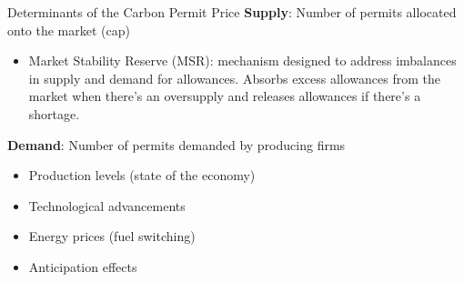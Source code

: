 \documentclass{beamer}
\begin{document}
\begin{frame}{Determinants of the Carbon Permit Price}
\textbf{Supply}: Number of permits allocated onto the market (cap)
    \begin{itemize}\small
        \item Market Stability Reserve (MSR): mechanism designed to address imbalances in supply and demand for allowances. Absorbs excess allowances from the market when there's an oversupply and releases allowances if there's a shortage.
    \end{itemize}
\textbf{Demand}: Number of permits demanded by producing firms
    \begin{itemize}
        \item Production levels (state of the economy)
        \item Technological advancements
        \item Energy prices (fuel switching)
        \item Anticipation effects
    \end{itemize}
\end{frame}
\end{document}
